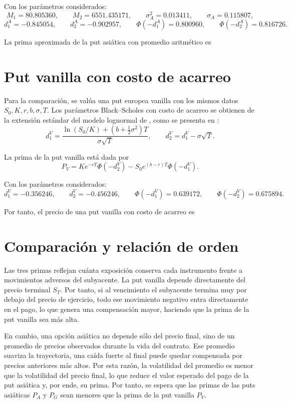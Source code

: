 \documentclass[11pt,letterpaper]{article}
\newcommand{\PhiN}{\Phi}
\begin{document}
Con los parámetros considerados:
\[
M_1=80.805360,
\qquad
M_2=6551.435171,
\qquad
\sigma_A^2=0.013411,
\qquad
\sigma_A=0.115807,
\]
\[
d_1^A=-0.845054,
\qquad
 d_2^A=-0.902957,
\qquad
\PhiN(-d_1^A)=0.800960,
\qquad
\PhiN(-d_2^A)=0.816726.
\]

La prima aproximada de la put asiática con promedio aritmético es
\resultbox{
\[
P_A=4.6415.
\]}

\section{Put vanilla con costo de acarreo}

Para la comparación, se valúa una put europea vanilla con los mismos datos \(S_0,K,r,b,\sigma,T\). Los parámetros Black--Scholes con costo de acarreo se obtienen de la extensión estándar del modelo lognormal de \citet{black1973}, como se presenta en \citet{hull2018}:
\begin{equation}
d_1^V=\frac{\ln(S_0/K)+(b+\frac{1}{2}\sigma^2)T}{\sigma\sqrt{T}},
\qquad
 d_2^V=d_1^V-\sigma\sqrt{T}.
\end{equation}

La prima de la put vanilla está dada por
\begin{equation}
P_V=Ke^{-rT}\PhiN(-d_2^V)-S_0e^{(b-r)T}\PhiN(-d_1^V).
\end{equation}

Con los parámetros considerados:
\[
d_1^V=-0.356246,
\qquad
 d_2^V=-0.456246,
\qquad
\PhiN(-d_1^V)=0.639172,
\qquad
\PhiN(-d_2^V)=0.675894.
\]

Por tanto, el precio de una put vanilla con costo de acarreo es
\resultbox{
\[
P_V=5.2186.
\]
}

\section{Comparación y relación de orden}

Las tres primas reflejan cuánta exposición conserva cada instrumento frente a movimientos adversos del subyacente. La put vanilla depende directamente del precio terminal \(S_T\). Por tanto, si al vencimiento el subyacente termina muy por debajo del precio de ejercicio, todo ese movimiento negativo entra directamente en el pago, lo que genera una compensación mayor, haciendo que la prima de la put vanilla sea más alta.

En cambio, una opción asiática no depende sólo del precio final, sino de un promedio de precios observados durante la vida del contrato. Ese promedio suaviza la trayectoria, una caída fuerte al final puede quedar compensada por precios anteriores más altos. Por esta razón, la volatilidad del promedio es menor que la volatilidad del precio final, lo que reduce el valor esperado del pago de la put asiática y, por ende, su prima. Por tanto, se espera que las primas de las puts asiáticas \(P_A\) y \(P_G\) sean menores que la prima de la put vanilla \(P_V\).
\end{document}
